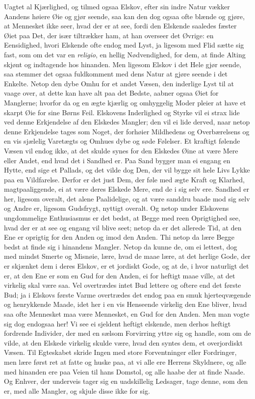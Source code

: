 \documentclass[12pt,a4paper]{book}
\newcommand{\apage}[1]{\marginnote{\footnotesize\textit{[#1]}}}
\begin{document}
Uagtet al Kjærlighed, og tilmed ogsaa Elskov, efter sin indre Natur
vækker Aandens høiere Øie og gjør seende, saa kan den dog ogsaa ofte
blænde og gjøre, at Mennesket ikke seer, hvad der er at see, fordi den
Elskende saaledes fæster Øiet paa Det, der især tiltrækker ham, at han
overseer det Øvrige: en Eensidighed, hvori Elskende ofte endog med Lyst,
ja ligesom med Flid sætte sig fast, som om det var en \textit{religio}, en hellig
Nødvendighed, for dem, at finde Alting skjønt og indtagende hos
hinanden. Men ligesom Elskov i det Hele gjør seende, saa stemmer det
ogsaa fuldkomment med dens Natur at gjøre seende i det Enkelte. Netop
den dybe Omhu for et andet Væsen, den inderlige Lyst til at vaage over,
at dette kan have alt paa det Bedste, aabner ogsaa Øiet for Manglerne;
hvorfor da og en ægte kjærlig og omhyggelig Moder pleier at have et
skarpt Øie for sine Børns Feil. Elskovens Inderlighed og Styrke vil ei
strax lide ved denne Erkjendelse af den Elskedes Mangler; den vil ei
lide derved, naar netop denne Erkjendelse tages som Noget, der forhøier
Mildhedens og Overbærelsens og en vis sjælelig Varetægts og Omhues dybe
og søde Følelser. Et kraftigt følende Væsen vil endog ikke, at det
skulde synes for den Elskedes Øine at være Mere eller Andet, \apage{94} end hvad
det i Sandhed er. Paa Sand bygger man ei engang en Hytte, end sige et
Pallads, og det vilde dog Den, der vil bygge sit hele Livs Lykke paa en
Vildfarelse. Derfor er det just Dem, der føle med ægte Kraft og Klarhed,
magtpaaliggende, ei at være deres Elskede Mere, end de i sig selv ere.
Sandhed er her, ligesom overalt, det alene Paalidelige, og at være
sanddru baade mod sig selv og Andre er, ligesom Gudsfrygt, nyttigt
overalt. Og netop under Elskovens ungdommelige Enthusiasmus er det
bedst, at Begge med reen Oprigtighed see, hvad der er at see og engang
vil blive seet; netop da er det allerede Tid, at den Ene er oprigtig for
den Anden og imod den Anden. Thi netop da lære Begge bedst at finde sig
i hinandens Mangler. Netop da kunne de, om ei lettest, dog med mindst
Smerte og Misnøie, lære, hvad de maae lære, at det herlige Gode, der er
skjænket dem i deres Elskov, er et jordiskt Gode, og at de, i hvor
naturligt det er, at den Ene er som en Gud for den Anden, ei for heftigt
maae ville, at det virkelig skal være saa. Vel overtrædes intet Bud
lettere og oftere end det første Bud; ja i Elskovs første Varme
overtrædes det endog paa en smuk hjerteqvægende og henrykkende Maade,
idet her i en vis Henseende virkelig den Ene bliver, hvad saa ofte
Mennesket maa være Mennesket, en Gud for den Anden. Men man vogte sig
dog endogsaa her! Vi see ei sjeldent heftigt elskende, men derhos
heftigt fordrende Individer, der med en sælsom Forvirring \apage{95} yttre sig og
handle, som om de vilde, at den Elskede virkelig skulde være, hvad den
syntes dem, et overjordiskt Væsen. Til Egteskabet skride Ingen med store
Forventninger eller Fordringer, men lære først ret at fatte og huske
paa, at vi alle ere Herrens Skyldnere, og alle med hinanden ere paa
Veien til hans Domstol, og alle haabe der at finde Naade. Og Enhver, der
underveis tager sig en uadskillelig Ledsager, tage denne, som den er,
med alle Mangler, og skjule disse ikke for sig.
\end{document}
